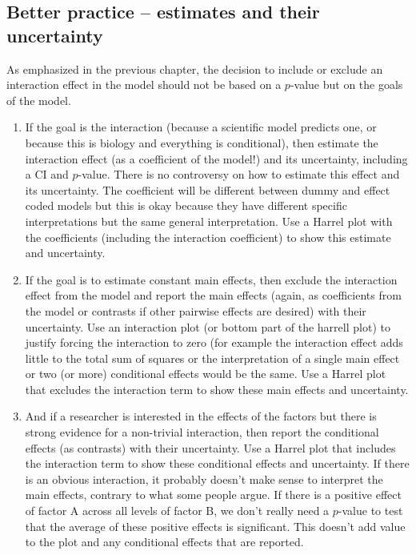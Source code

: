 \documentclass[]{book}
\begin{document}
\subsection{Better practice -- estimates and their
uncertainty}\label{better-practice-estimates-and-their-uncertainty}

As emphasized in the previous chapter, the decision to include or
exclude an interaction effect in the model should not be based on a
\(p\)-value but on the goals of the model.

\begin{enumerate}
\def\labelenumi{\arabic{enumi}.}
\item
  If the goal is the interaction (because a scientific model predicts
  one, or because this is biology and everything is conditional), then
  estimate the interaction effect (as a coefficient of the model!) and
  its uncertainty, including a CI and \(p\)-value. There is no
  controversy on how to estimate this effect and its uncertainty. The
  coefficient will be different between dummy and effect coded models
  but this is okay because they have different specific interpretations
  but the same general interpretation. Use a Harrel plot with the
  coefficients (including the interaction coefficient) to show this
  estimate and uncertainty.
\item
  If the goal is to estimate constant main effects, then exclude the
  interaction effect from the model and report the main effects (again,
  as coefficients from the model or contrasts if other pairwise effects
  are desired) with their uncertainty. Use an interaction plot (or
  bottom part of the harrell plot) to justify forcing the interaction to
  zero (for example the interaction effect adds little to the total sum
  of squares or the interpretation of a single main effect or two (or
  more) conditional effects would be the same. Use a Harrel plot that
  excludes the interaction term to show these main effects and
  uncertainty.
\item
  And if a researcher is interested in the effects of the factors but
  there is strong evidence for a non-trivial interaction, then report
  the conditional effects (as contrasts) with their uncertainty. Use a
  Harrel plot that includes the interaction term to show these
  conditional effects and uncertainty. If there is an obvious
  interaction, it probably doesn't make sense to interpret the main
  effects, contrary to what some people argue. If there is a positive
  effect of factor A across all levels of factor B, we don't really need
  a \(p\)-value to test that the average of these positive effects is
  significant. This doesn't add value to the plot and any conditional
  effects that are reported.
\end{enumerate}
\end{document}
